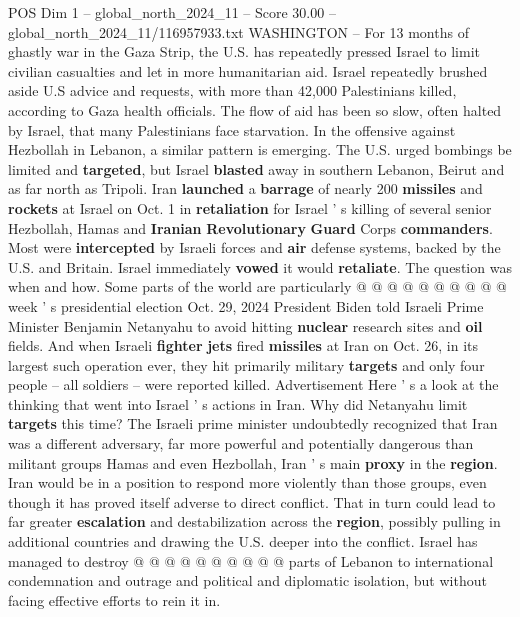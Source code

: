\begin{textsample}{POS Dim 1 – global\_north\_2024\_11 – Score 30.00 – global\_north\_2024\_11/116957933.txt}  \label{ex:f1_pos_231}
WASHINGTON -- For 13 months of ghastly war in the Gaza Strip, the U.S. has repeatedly pressed Israel to limit civilian casualties and let in more humanitarian aid.
Israel repeatedly brushed aside U.S advice and requests, with more than 42,000 Palestinians killed, according to Gaza health officials.
The flow of aid has been so slow, often halted by Israel, that many Palestinians face starvation.
In the offensive against Hezbollah in Lebanon, a similar pattern is emerging.
The U.S. urged bombings be limited and \textbf{targeted}, but Israel \textbf{blasted} away in southern Lebanon, Beirut and as far north as Tripoli.
Iran \textbf{launched} a \textbf{barrage} of nearly 200 \textbf{missiles} and \textbf{rockets} at Israel on Oct. 1 in \textbf{retaliation} for Israel ' s killing of several senior Hezbollah, Hamas and \textbf{Iranian} \textbf{Revolutionary} \textbf{Guard} Corps \textbf{commanders}.
Most were \textbf{intercepted} by Israeli forces and \textbf{air} defense systems, backed by the U.S. and Britain.
Israel immediately \textbf{vowed} it would \textbf{retaliate}.
The question was when and how.
Some parts of the world are particularly @ @ @ @ @ @ @ @ @ @ week ' s presidential election Oct. 29, 2024 President Biden told Israeli Prime Minister Benjamin Netanyahu to avoid hitting \textbf{nuclear} research sites and \textbf{oil} fields.
And when Israeli \textbf{fighter} \textbf{jets} fired \textbf{missiles} at Iran on Oct. 26, in its largest such operation ever, they hit primarily military \textbf{targets} and only four people -- all soldiers -- were reported killed.
Advertisement Here ' s a look at the thinking that went into Israel ' s actions in Iran.
Why did Netanyahu limit \textbf{targets} this time?
The Israeli prime minister undoubtedly recognized that Iran was a different adversary, far more powerful and potentially dangerous than militant groups Hamas and even Hezbollah, Iran ' s main \textbf{proxy} in the \textbf{region}.
Iran would be in a position to respond more violently than those groups, even though it has proved itself adverse to direct conflict.
That in turn could lead to far greater \textbf{escalation} and destabilization across the \textbf{region}, possibly pulling in additional countries and drawing the U.S. deeper into the conflict.
Israel has managed to destroy @ @ @ @ @ @ @ @ @ @ parts of Lebanon to international condemnation and outrage and political and diplomatic isolation, but without facing effective efforts to rein it in.

\end{textsample}
